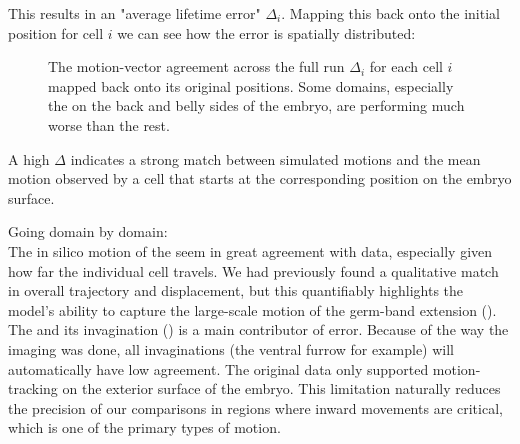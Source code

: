 This results in an "average lifetime error" $\Delta_i$. Mapping this back onto the initial position for cell $i$ we can see how the error is spatially distributed:
\begin{figure}[H]
    \centering
    \caption{The motion-vector agreement across the full run $\Delta_i$ for each cell $i$ mapped back onto its original positions. Some domains, especially the on the back and belly sides of the embryo, are performing much worse than the rest. }
    \label{fig:}
\end{figure}


A high $\Delta$ indicates a strong match between simulated motions and the mean motion observed by a cell that starts at the corresponding position on the embryo surface. 

Going domain by domain:\\

The in silico motion of the  seem in great agreement with data, especially given how far the individual cell travels. We had previously found a qualitative match in overall trajectory and displacement, but this quantifiably highlights the model's ability to capture the large-scale motion of the germ-band extension ().\\

The  and its invagination () is a main contributor of error. Because of the way the imaging was done, all invaginations (the ventral furrow for example) will automatically have low agreement. The original data only supported motion-tracking on the exterior surface of the embryo.  This limitation naturally reduces the precision of our comparisons in regions where inward movements are critical, which is one of the primary types of motion. \\

